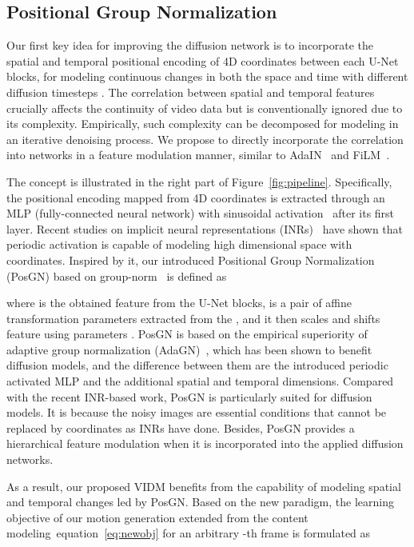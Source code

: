 \documentclass[letterpaper]{article}
\def\eqref#1{equation~\ref{#1}}
\begin{document}
\subsection{Positional Group Normalization}
Our first key idea for improving the diffusion network is to incorporate the spatial and temporal positional encoding of 4D coordinates  between each U-Net blocks, for modeling continuous changes in both the space  and time  with different diffusion timesteps .
The correlation between spatial and temporal features crucially affects the continuity of video data but is conventionally ignored due to its complexity.
Empirically, such complexity can be decomposed for modeling in an iterative denoising process. We propose to directly incorporate the correlation into networks in a feature modulation manner, similar to AdaIN~\cite{karras2019style} and FiLM~\cite{perez2018film}.

The concept is illustrated in the right part of Figure~\ref{fig:pipeline}.
Specifically, the positional encoding mapped from 4D coordinates is extracted through an MLP (fully-connected neural network) with sinusoidal activation~\cite{sitzmann2020implicit} after its first layer.
Recent studies on implicit neural representations (INRs)~\cite{sitzmann2020implicit,tancik2020fourier} have shown that periodic activation is capable of modeling high dimensional space with coordinates.
Inspired by it, our introduced Positional Group Normalization (PosGN) based on group-norm~\cite{wu2018group} is defined as 

where  is the obtained feature from the U-Net blocks,  is a pair of affine transformation parameters extracted from the , and it then scales and shifts feature  using parameters .
PosGN is based on the empirical superiority of adaptive group normalization (AdaGN)~\cite{nichol2021improved}, which has been shown to benefit diffusion models, and the difference between them are the introduced periodic activated MLP and the additional spatial and temporal dimensions.
Compared with the recent INR-based work, PosGN is particularly suited for diffusion models.
It is because the noisy images are essential conditions that cannot be replaced by coordinates as INRs have done.
Besides, PosGN provides a hierarchical feature modulation when it is incorporated into the applied diffusion networks.

As a result, our proposed VIDM benefits from the capability of modeling spatial and temporal changes led by PosGN.
Based on the new paradigm, the learning objective of our motion generation extended from the content modeling~\eqref{eq:newobj} for an arbitrary -th frame is formulated as 
\end{document}
